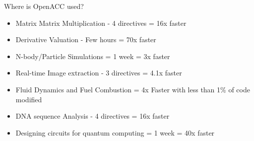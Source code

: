 \documentclass[aspectratio=169]{beamer}
\begin{document}
\begin{frame}[fragile]{Where is OpenACC used?}

\begin{itemize}
\item Matrix Matrix Multiplication - 4 directives = 16x faster
\item Derivative Valuation - Few hours = 70x faster
\item N-body/Particle Simulations = 1 week = 3x faster
\item Real-time Image extraction - 3 directives = 4.1x faster
\item Fluid Dynamics and Fuel Combustion  = 4x Faster with less than 1\% of code modified
\item DNA sequence Analysis - 4 directives = 16x faster
\item Designing circuits for quantum
computing = 1 week = 40x faster
\end{itemize}

\end{frame}
\end{document}
